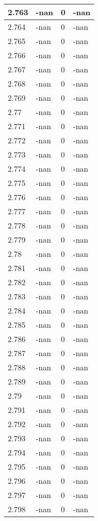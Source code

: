 \documentclass[a4paper,14pt]{extarticle}
\begin{document}
\begin{longtable}{||m{3cm}||m{3cm}|m{3cm}||m{3cm}||}
\hline
2.763 & -nan & 0 & -nan\\
\hline
2.764 & -nan & 0 & -nan\\
\hline
2.765 & -nan & 0 & -nan\\
\hline
2.766 & -nan & 0 & -nan\\
\hline
2.767 & -nan & 0 & -nan\\
\hline
2.768 & -nan & 0 & -nan\\
\hline
2.769 & -nan & 0 & -nan\\
\hline
2.77 & -nan & 0 & -nan\\
\hline
2.771 & -nan & 0 & -nan\\
\hline
2.772 & -nan & 0 & -nan\\
\hline
2.773 & -nan & 0 & -nan\\
\hline
2.774 & -nan & 0 & -nan\\
\hline
2.775 & -nan & 0 & -nan\\
\hline
2.776 & -nan & 0 & -nan\\
\hline
2.777 & -nan & 0 & -nan\\
\hline
2.778 & -nan & 0 & -nan\\
\hline
2.779 & -nan & 0 & -nan\\
\hline
2.78 & -nan & 0 & -nan\\
\hline
2.781 & -nan & 0 & -nan\\
\hline
2.782 & -nan & 0 & -nan\\
\hline
2.783 & -nan & 0 & -nan\\
\hline
2.784 & -nan & 0 & -nan\\
\hline
2.785 & -nan & 0 & -nan\\
\hline
2.786 & -nan & 0 & -nan\\
\hline
2.787 & -nan & 0 & -nan\\
\hline
2.788 & -nan & 0 & -nan\\
\hline
2.789 & -nan & 0 & -nan\\
\hline
2.79 & -nan & 0 & -nan\\
\hline
2.791 & -nan & 0 & -nan\\
\hline
2.792 & -nan & 0 & -nan\\
\hline
2.793 & -nan & 0 & -nan\\
\hline
2.794 & -nan & 0 & -nan\\
\hline
2.795 & -nan & 0 & -nan\\
\hline
2.796 & -nan & 0 & -nan\\
\hline
2.797 & -nan & 0 & -nan\\
\hline
2.798 & -nan & 0 & -nan\\

\end{longtable}
\end{document}
